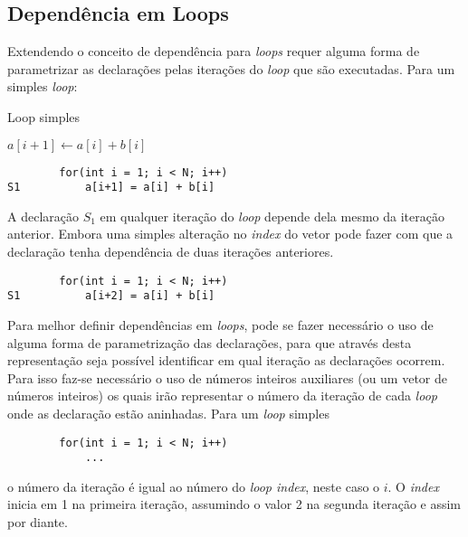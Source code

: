 \subsection{Dependência em Loops}

Extendendo o conceito de dependência para \textit{loops} requer alguma forma de
parametrizar as declarações pelas iterações do \textit{loop} que são
executadas.
Para um simples \textit{loop}:

\begin{algorithm}
        \caption{Loop simples}
        \begin{algorithmic}[1]
                \STATE $a[i + 1] \leftarrow a[i] + b[i] $
        \ENDFOR
        \end{algorithmic}
\end{algorithm}

\begin{verbatim}
        for(int i = 1; i < N; i++)
S1          a[i+1] = a[i] + b[i]
\end{verbatim}

A declaração $S_1$ em qualquer iteração do \textit{loop} depende dela mesmo da
iteração anterior. Embora uma simples alteração no \textit{index} do vetor pode
fazer com que a declaração tenha dependência de duas iterações anteriores.

\begin{verbatim}
        for(int i = 1; i < N; i++)
S1          a[i+2] = a[i] + b[i]
\end{verbatim}

Para melhor definir dependências em \textit{loops},  pode se fazer necessário o
uso de alguma forma de parametrização das declarações, para que através desta
representação seja possível identificar em qual iteração as declarações ocorrem.
Para isso faz-se necessário o uso de números inteiros auxiliares (ou um vetor de
números inteiros) os quais irão representar o número da iteração de cada 
\textit{loop} onde as declaração estão aninhadas.
Para um \textit{loop} simples

\begin{verbatim}
        for(int i = 1; i < N; i++)
            ...
\end{verbatim}

o número da iteração é igual ao número do \textit{loop index}, neste caso o $i$.
O \textit{index} inicia em 1 na primeira iteração, assumindo o valor 2 na
segunda iteração e assim por diante.

